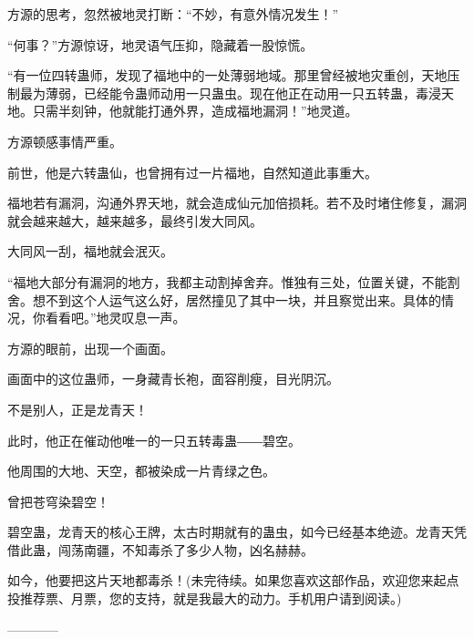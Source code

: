 \begin{this_body}
方源的思考，忽然被地灵打断：“不妙，有意外情况发生！”

“何事？”方源惊讶，地灵语气压抑，隐藏着一股惊慌。

“有一位四转蛊师，发现了福地中的一处薄弱地域。那里曾经被地灾重创，天地压制最为薄弱，已经能令蛊师动用一只蛊虫。现在他正在动用一只五转蛊，毒浸天地。只需半刻钟，他就能打通外界，造成福地漏洞！”地灵道。

方源顿感事情严重。

前世，他是六转蛊仙，也曾拥有过一片福地，自然知道此事重大。

福地若有漏洞，沟通外界天地，就会造成仙元加倍损耗。若不及时堵住修复，漏洞就会越来越大，越来越多，最终引发大同风。

大同风一刮，福地就会泯灭。

“福地大部分有漏洞的地方，我都主动割掉舍弃。惟独有三处，位置关键，不能割舍。想不到这个人运气这么好，居然撞见了其中一块，并且察觉出来。具体的情况，你看看吧。”地灵叹息一声。

方源的眼前，出现一个画面。

画面中的这位蛊师，一身藏青长袍，面容削瘦，目光阴沉。

不是别人，正是龙青天！

此时，他正在催动他唯一的一只五转毒蛊――碧空。

他周围的大地、天空，都被染成一片青绿之色。

曾把苍穹染碧空！

碧空蛊，龙青天的核心王牌，太古时期就有的蛊虫，如今已经基本绝迹。龙青天凭借此蛊，闯荡南疆，不知毒杀了多少人物，凶名赫赫。

如今，他要把这片天地都毒杀！(未完待续。如果您喜欢这部作品，欢迎您来起点投推荐票、月票，您的支持，就是我最大的动力。手机用户请到阅读。)

------------

\end{this_body}

